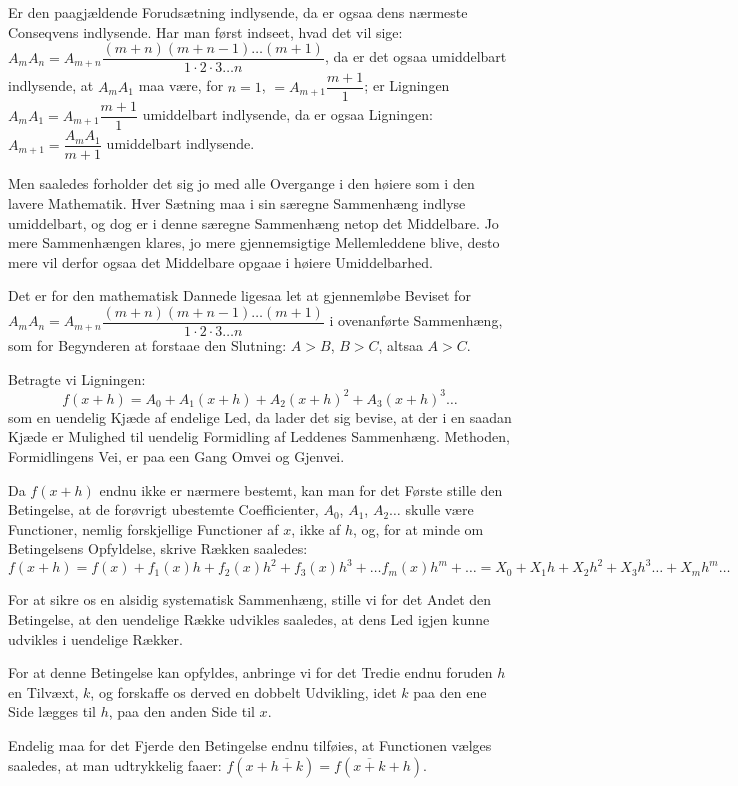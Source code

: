\documentclass[12pt]{book}
\newcommand{\opage}[1]{\marginnote{\footnotesize\textit{[#1]}}}
\begin{document}
Er den paagjældende Forudsætning indlysende, da er ogsaa dens nærmeste
Conseqvens indlysende. Har man først indseet, hvad det vil sige:
$A_m A_n = A_{m+n}\dfrac{(m+n)(m+n-1)\dots(m+1)}{1\cdot 2\cdot 3\dots n}$, da er
det ogsaa umiddelbart indlysende, at $A_m A_1$ maa være, for $n = 1$,
$= A_{m+1}\dfrac{m+1}{1}$; er Ligningen $A_m A_1 = A_{m+1}\dfrac{m+1}{1}$
umiddelbart indlysende, da er ogsaa Ligningen:
$A_{m+1} = \dfrac{A_m A_1}{m+1}$ umiddelbart indlysende.

Men saaledes forholder det sig jo med alle Overgange i den høiere som i den
lavere Mathematik. Hver Sætning maa i sin særegne Sammenhæng indlyse umiddelbart,
og dog er i denne særegne Sammenhæng netop det Middelbare. Jo mere Sammenhængen
klares, jo mere gjennemsigtige Mellemleddene blive, desto mere vil derfor ogsaa
det Middelbare opgaae i høiere Umiddelbarhed.

\opage{43} Det er for den mathematisk Dannede ligesaa let at gjennemløbe Beviset for
$A_m A_n = A_{m+n}\dfrac{(m+n)(m+n-1)\dots(m+1)}{1\cdot 2\cdot 3\dots n}$ i
ovenanførte Sammenhæng, som for Begynderen at forstaae den Slutning: $A > B$,
$B > C$, altsaa $A > C$.

Betragte vi Ligningen:
\[
f(x+h) = A_0 + A_1(x+h) + A_2(x+h)^{2} + A_3(x+h)^{3}\dots
\]
som en uendelig Kjæde af endelige Led, da lader det sig bevise, at der i en
saadan Kjæde er Mulighed til uendelig Formidling af Leddenes Sammenhæng.
Methoden, Formidlingens Vei, er paa een Gang Omvei og Gjenvei.

Da $f(x+h)$ endnu ikke er nærmere bestemt, kan man for det Første stille den
Betingelse, at de forøvrigt ubestemte Coefficienter, $A_0$, $A_1$, $A_2\dots$
skulle være Functioner, nemlig forskjellige Functioner af $x$, ikke af $h$, og,
for at minde om Betingelsens Opfyldelse, skrive Rækken saaledes:
\[
f(x+h) = f(x) + f_1(x)h + f_2(x)h^{2} + f_3(x)h^{3} + \dots f_m(x)h^{m} + \dots
= X_0 + X_1 h + X_2 h^{2} + X_3 h^{3}\dots + X_m h^{m}\dots
\]

For at sikre os en alsidig systematisk Sammenhæng, stille vi for det Andet den
Betingelse, at den uendelige Række udvikles saaledes, at dens Led igjen kunne
udvikles i uendelige Rækker.

For at denne Betingelse kan opfyldes, anbringe vi for det Tredie endnu foruden
$h$ en Tilvæxt, $k$, og forskaffe os derved en dobbelt Udvikling, idet $k$ paa
den ene Side lægges til $h$, paa den anden Side til $x$.

Endelig maa for det Fjerde den Betingelse endnu tilføies, at Functionen vælges
saaledes, at man udtrykkelig faaer:
$f(x + \overline{h+k}) = f(\overline{x+k} + h)$.
\end{document}
